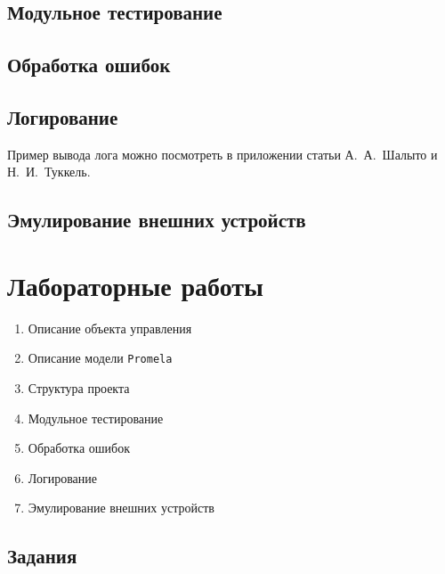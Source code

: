 \documentclass[12pt, twoside]{report}
\begin{document}
\newpage
\section*{Модульное тестирование}\label{practical_work_4}

\newpage
\section*{Обработка ошибок}\label{practical_work_5}

\newpage
\section*{Логирование}\label{practical_work_6}

Пример вывода лога можно посмотреть в приложении статьи А.~А.~Шалыто и Н.~И.~Туккель\cite{Shalito:Switch}.

\newpage
\section*{Эмулирование внешних устройств}\label{practical_work_7}


\newpage
\chapter*{Лабораторные работы}\label{labs_works}

\begin{enumerate}
  \item Описание объекта управления
  \item Описание модели \texttt{Promela}
  \item Структура проекта
  \item Модульное тестирование 
  \item Обработка ошибок
  \item Логирование
  \item Эмулирование внешних устройств
\end{enumerate}

\section*{Задания}\label{lab_work_formatting}
\end{document}
